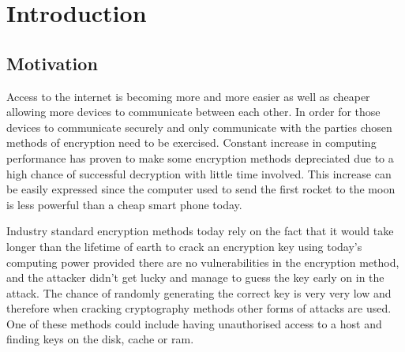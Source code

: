 \chapter{Introduction}
\label{chap:intro}

\section{Motivation}
Access to the internet is becoming more and more easier as well as cheaper allowing more devices to communicate between each other. In order for those devices to communicate securely and only communicate with the parties chosen methods of encryption need to be exercised. Constant increase in computing performance has proven to make some encryption methods depreciated due to a high chance of successful decryption with little time involved. This increase can be easily expressed since the computer used to send the first rocket to the moon is less powerful than a cheap smart phone today. 

Industry standard encryption methods today rely on the fact that it would take longer than the lifetime of earth to crack an encryption key using today's computing power provided there are no vulnerabilities in the encryption method, and the attacker didn't get lucky and manage to guess the key early on in the attack.
The chance of randomly generating the correct key is very very low and therefore when cracking cryptography methods other forms of attacks are used. 
One of these methods could include having unauthorised access to a host and finding keys on the disk, cache or ram.

